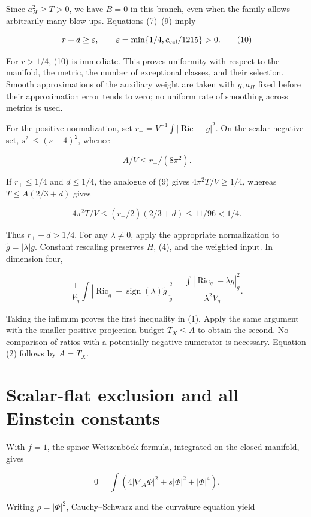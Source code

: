 \documentclass[
  10pt,
]{article}
\begin{document}
Since \(a_H^2\ge T>0\), we have \(B=0\) in this branch, even when the
family allows arbitrarily many blow-ups. Equations (7)--(9) imply

\[
r+d\ge\varepsilon,\qquad
\varepsilon=\min\{1/4,c_{\rm cal}/1215\}>0.             \tag{10}
\]

For \(r>1/4\), (10) is immediate. This proves uniformity with respect to
the manifold, the metric, the number of exceptional classes, and their
selection. Smooth approximations of the auxiliary weight are taken with
\(g,a_H\) fixed before their approximation error tends to zero; no
uniform rate of smoothing across metrics is used.

For the positive normalization, set
\(r_+=V^{-1}\int|\operatorname{Ric}-g|^2\). On the scalar-negative set,
\(s_-^2\le(s-4)^2\), whence

\[
A/V\le r_+/(8\pi^2).
\]

If \(r_+\le1/4\) and \(d\le1/4\), the analogue of (9) gives
\(4\pi^2T/V\ge1/4\), whereas \(T\le A(2/3+d)\) gives

\[
4\pi^2T/V\le(r_+/2)(2/3+d)\le11/96<1/4.
\]

Thus \(r_++d>1/4\). For any \(\lambda\ne0\), apply the appropriate
normalization to \(\widetilde g=|\lambda|g\). Constant rescaling
preserves \(H\), (4), and the weighted input. In dimension four,

\[
\frac1{V_{\widetilde g}}\int
 |\operatorname{Ric}_{\widetilde g}-\operatorname{sign}(\lambda)
             \widetilde g|_{\widetilde g}^2
=\frac{\int|\operatorname{Ric}_g-\lambda g|_g^2}{\lambda^2V_g}.
\]

Taking the infimum proves the first inequality in (1). Apply the same
argument with the smaller positive projection budget \(T_X\le A\) to
obtain the second. No comparison of ratios with a potentially negative
numerator is necessary. Equation (2) follows by \(A=T_X\).

\hypertarget{scalar-flat-exclusion-and-all-einstein-constants}{%
\section{Scalar-flat exclusion and all Einstein
constants}\label{scalar-flat-exclusion-and-all-einstein-constants}}

With \(f=1\), the spinor Weitzenböck formula, integrated on the closed
manifold, gives

\[
0=\int(4|\nabla_{\mathcal A}\Phi|^2+s|\Phi|^2+|\Phi|^4).
\]

Writing \(\rho=|\Phi|^2\), Cauchy--Schwarz and the curvature equation
yield
\end{document}
